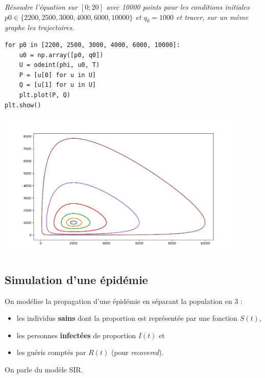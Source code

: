 \begin{Exercise}\it
Résoudre l'équation sur $[0; 20]$ avec 10000 points pour les conditions initiales $p0 \in \{2200, 2500, 3000, 4000, 6000, 10000\}$ et $q_0 = 1000$ et tracer, sur un même graphe les trajectoires.
\end{Exercise}
\begin{Answer}
\begin{lstlisting}
for p0 in [2200, 2500, 3000, 4000, 6000, 10000]:
    u0 = np.array([p0, q0])
    U = odeint(phi, u0, T)
    P = [u[0] for u in U]
    Q = [u[1] for u in U]
    plt.plot(P, Q)
plt.show()
\end{lstlisting}
\begin{center}
\includegraphics[width=12cm]{TP/Images/ED2_proies2.png}
\end{center}
\end{Answer}
\subsection{Simulation d'une épidémie}
On modélise la propagation d'une épidémie en séparant la population en 3 :
\begin{itemize}
    \item les individus {\bf sains} dont la proportion est représentée par une fonction $S(t)$,
    \item les personnes {\bf infectées} de proportion $I(t)$ et
    \item les guéris comptés par $R(t)$ (pour {\it recovered}).
\end{itemize}
On parle du modèle SIR.

